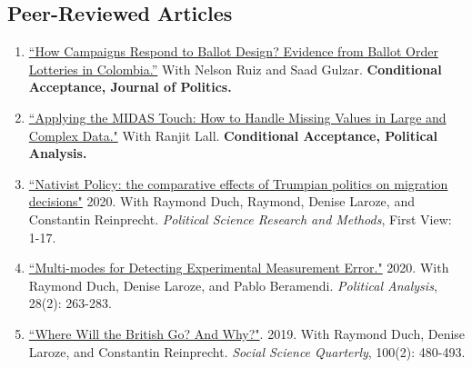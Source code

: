 \documentclass[11pt, a4paper]{article}
\begin{document}
 \subsection*{Peer-Reviewed Articles}

 \begin{enumerate}

 \item \href{https://www.dropbox.com/s/4uybbp4h9shmzxt/ballots_colombia.pdf?raw=1}{``How Campaigns Respond to Ballot Design? Evidence from Ballot Order Lotteries in Colombia.''} With Nelson Ruiz and Saad Gulzar. \textbf{Conditional Acceptance, Journal of Politics.}

 \item \href{https://doi.org/10.33774/apsa-2020-3tk40-v3}{``Applying the MIDAS Touch: How to Handle Missing Values in Large and Complex Data."} With Ranjit Lall. \textbf{Conditional Acceptance, Political Analysis.}

 \item \href{https://doi.org/10.1017/psrm.2020.33}{``Nativist Policy: the comparative effects of Trumpian politics on migration decisions"} 2020. With Raymond Duch, Raymond, Denise Laroze, and Constantin Reinprecht. \textit{Political Science Research and Methods}, First View: 1-17.

 \item \href{https://www.cambridge.org/core/journals/political-analysis/article/multimodes-for-detecting-experimental-measurement-error/37514FC46CF29C7B345DB9881E252150/share/7b059037b0da9182a33316d7f87b2de81b619592}{``Multi-modes for Detecting Experimental Measurement Error."} 2020. With Raymond Duch, Denise Laroze, and Pablo Beramendi. \textit{Political Analysis}, 28(2): 263-283.

 \item \href{https://doi.org/10.1111/ssqu.12584}{``Where Will the British Go? And Why?"}. 2019. With Raymond Duch, Denise Laroze, and Constantin Reinprecht. \textit{Social Science Quarterly}, 100(2): 480-493. 

\end{enumerate}






\end{document}
